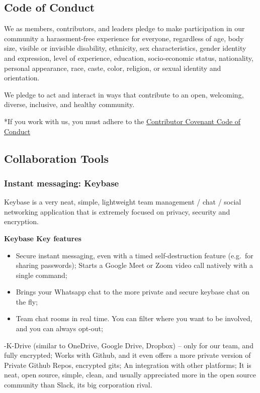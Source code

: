 \documentclass[
  fontsize=13pt,
  english,
  a4paper,
  openany, a4paper, oneside]{article}
\begin{document}
\hypertarget{code-of-conduct}{%
\subsection{Code of Conduct}\label{code-of-conduct}}

We as members, contributors, and leaders pledge to make participation in our
community a harassment-free experience for everyone, regardless of age, body
size, visible or invisible disability, ethnicity, sex characteristics, gender
identity and expression, level of experience, education, socio-economic status,
nationality, personal appearance, race, caste, color, religion, or sexual identity and orientation.

We pledge to act and interact in ways that contribute to an open, welcoming,
diverse, inclusive, and healthy community.

*If you work with us, you must adhere to the \protect\hyperlink{covenant}{Contributor Covenant Code of Conduct}

\hypertarget{collaboration-tools}{%
\subsection{Collaboration Tools}\label{collaboration-tools}}

\hypertarget{keybase}{%
\subsubsection{Instant messaging: Keybase}\label{keybase}}

Keybase is a very neat, simple, lightweight team management / chat / social networking application that is extremely focused on privacy, security and encryption.

\textbf{Keybase Key features}

\begin{itemize}
\item
  Secure instant messaging, even with a timed self-destruction feature (e.g.~for sharing passwords);
  Starts a Google Meet or Zoom video call natively with a single command;
\item
  Brings your Whatsapp chat to the more private and secure keybase chat on the fly;
\item
  Team chat rooms in real time. You can filter where you want to be involved, and you can always opt-out;
\end{itemize}

-K-Drive (similar to OneDrive, Google Drive, Dropbox) -- only for our team, and fully encrypted;
Works with Github, and it even offers a more private version of Private Github Repos, encrypted gits;
An integration with other platforms;
It is neat, open source, simple, clean, and usually appreciated more in the open source community than Slack, its big corporation rival.
\end{document}
